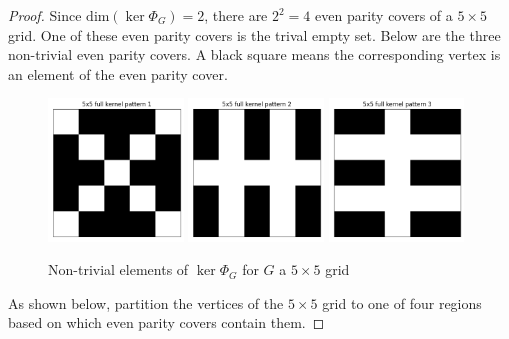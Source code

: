 \documentclass[a4paper]{article}
\renewcommand{\dim}[1]{\text{dim}\left( #1 \right)}
\begin{document}
	\begin{proof}
		Since $\dim{\ker{\Phi_G}} = 2$, there are $2^2 = 4$ even parity covers of a $5 \times 5$ grid.
		One of these even parity covers is the trival empty set.
		Below are the three non-trivial even parity covers.
		A black square means the corresponding vertex is an element of the even parity cover.
		
		\begin{figure}[H]
			\centering
			\includegraphics[width=0.32\textwidth]{../../code/serialization/kernels/5x5/full/5x5_kernel_full_1.png}
			\includegraphics[width=0.32\textwidth]{../../code/serialization/kernels/5x5/full/5x5_kernel_full_2.png}
			\includegraphics[width=0.32\textwidth]{../../code/serialization/kernels/5x5/full/5x5_kernel_full_3.png}
			\caption{Non-trivial elements of $\ker{\Phi_G}$ for $G$ a $5 \times 5$ grid}
		\end{figure}
	
		As shown below, partition the vertices of the $5 \times 5$ grid to one of four regions based on which even parity covers contain them.
		

\end{proof}
\end{document}
